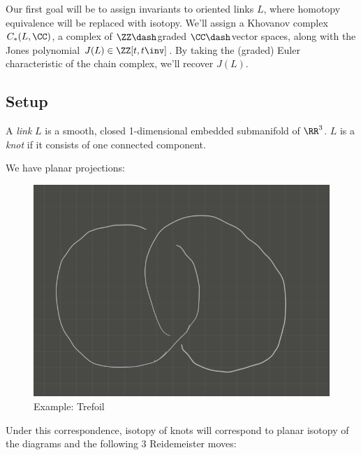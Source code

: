 Our first goal will be to assign invariants to oriented links \(L\),
where homotopy equivalence will be replaced with isotopy. We'll assign a
Khovanov complex \(C_*(L,\CC)\), a complex of \(\ZZ\dash\)graded
\(\CC\dash\)vector spaces, along with the Jones polynomial
\(J(L) \in \ZZ[t, t\inv]\). By taking the (graded) Euler characteristic
of the chain complex, we'll recover \(J(L)\).

\hypertarget{setup}{%
\subsection{Setup}\label{setup}}

\begin{description}
\tightlist
\item[Definition]
A \emph{link} \(L\) is a smooth, closed 1-dimensional embedded
submanifold of \(\RR^3\). \(L\) is a \emph{knot} if it consists of one
connected component.
\end{description}

We have planar projections:

\begin{figure}
\centering
\includegraphics{figures/image_2020-07-06-11-30-13.png}
\caption{Example: Trefoil}
\end{figure}

Under this correspondence, isotopy of knots will correspond to planar
isotopy of the diagrams and the following 3 Reidemeister moves:

